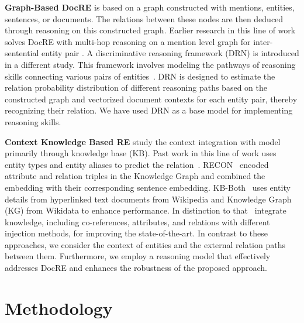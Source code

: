 \documentclass[letterpaper]{article} %
\begin{document}
\textbf{Graph-Based DocRE} is based on a graph constructed with mentions, entities, sentences, or documents. The relations between these nodes are then deduced through reasoning on this constructed graph. Earlier research in this line of work solves DocRE with multi-hop reasoning on a mention level graph for inter-sentential entity pair \cite{zeng-etal-2020-double}. 
A discriminative reasoning framework (DRN) is introduced in a different study. This framework involves modeling the pathways of reasoning skills connecting various pairs of entities~\cite{xu-etal-2021-discriminative}. DRN is designed to estimate the relation probability distribution of different reasoning paths based on the constructed graph and vectorized document contexts for each entity pair, thereby recognizing their relation. We have used DRN as a base model for implementing reasoning skills. 

\textbf{Context Knowledge Based RE} study the context integration with model primarily through knowledge base (KB). Past work in this line of work uses entity types and entity aliases to predict the relation~\cite{vashishth-etal-2018-reside,10.1007/978-3-030-62419-4_11}. RECON~\cite{DBLP:conf/www/BastosN0MSHK21} encoded attribute and relation triples in the Knowledge Graph and combined the embedding with their corresponding sentence embedding. KB-Both~\cite{DBLP:conf/acl/VerlindenZDDD21} uses entity details from hyperlinked text documents from Wikipedia and Knowledge Graph (KG) from Wikidata to enhance performance.
In distinction to that~\cite{DBLP:conf/semweb/WangWSH22} integrate knowledge, including co-references, attributes, and relations with different injection methods, for improving the state-of-the-art. In contrast to these approaches, we consider the context of entities and the external relation paths between them. Furthermore, we employ a reasoning model that effectively addresses DocRE and enhances the robustness of the proposed approach.

\section{Methodology}
\end{document}
